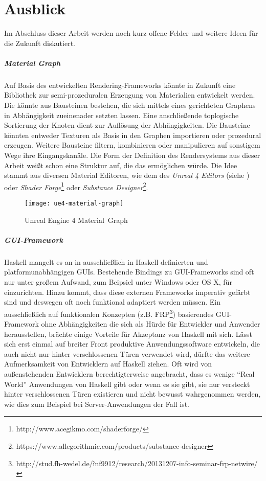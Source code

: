 \chapter{Ausblick}
\label{chap:ausblick}

Im Abschluss dieser Arbeit werden noch kurz offene Felder und weitere Ideen für die Zukunft diskutiert.

\paragraph{Material Graph} Auf Basis des entwickelten Rendering-Frameworks könnte in Zukunft eine Bibliothek zur semi-prozeduralen Erzeugung von Materialien entwickelt werden. Die könnte aus Bausteinen bestehen, die sich mittels eines gerichteten Graphens in Abhängigkeit zueinenader setzten lassen. Eine anschließende toplogische Sortierung der Knoten dient zur Auflösung der Abhängigkeiten. Die Bausteine könnten entweder Texturen als Basis in den Graphen importieren oder prozedural erzeugen. Weitere Bausteine filtern, kombinieren oder manipulieren auf sonstigem Wege ihre Eingangskanäle. Die Form der Definition des Rendersystems aus dieser Arbeit weißt schon eine Struktur auf, die das ermöglichen würde. Die Idee stammt aus diversen Material Editoren, wie dem des \textit{Unreal 4 Editors} (siehe ) oder \textit{Shader Forge}\footnote{http://www.acegikmo.com/shaderforge/} oder \textit{Substance Designer}\footnote{https://www.allegorithmic.com/products/substance-designer}.

\begin{wrapfigure}{r}{0.5\linewidth}
\centering
\texttt{[image: ue4-material-graph]}
\caption{Unreal Engine 4 \mbox{Material Graph}}\label{fig:material-graph}
\end{wrapfigure}

\paragraph{GUI-Framework}\label{sec:gui-framework} Haskell mangelt es an in ausschließlich in Haskell definierten und platformunabhängigen \acsp{GUI}. Bestehende Bindings zu \acs{GUI}-Frameworks sind oft nur unter großem Aufwand, zum Beipsiel unter Windows oder OS X, für einzurichten. Hinzu kommt, dass diese externen Frameworks imperativ gefärbt sind und deswegen oft noch funktional adaptiert werden müssen. Ein ausschließlich auf funktionalen Konzepten (z.B. \ac{FRP}\footnote{http://stud.fh-wedel.de/\~inf9912/research/20131207-info-seminar-frp-netwire/}) basierendes \acs{GUI}-Framework ohne Abhängigkeiten die sich als Hürde für Entwickler und Anwender herausstellen, brächte einige Vorteile für Akzeptanz von Haskell mit sich. Lässt sich erst einmal auf breiter Front produktive Anwendungssoftware entwickeln, die auch nicht nur hinter verschlossenen Türen verwendet wird, dürfte das weitere Aufmerksamkeit von Entwicklern auf Haskell ziehen. Oft wird von außenstehenden Entwicklern berechtigterweise angebracht, dass es wenige "`Real World"' Anwendungen von Haskell gibt oder wenn es sie gibt, sie nur versteckt hinter verschlossenen Türen existieren und nicht bewusst wahrgenommen werden, wie dies zum Beispiel bei Server-Anwendungen der Fall ist.

